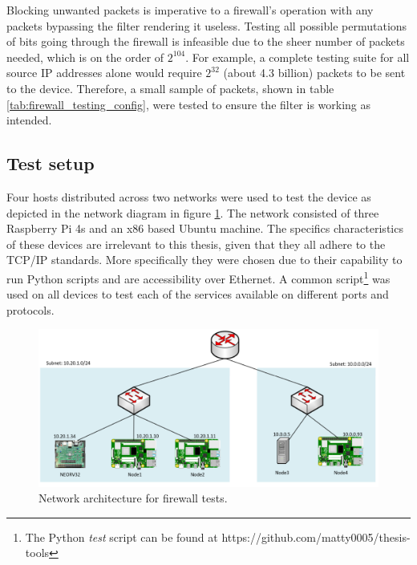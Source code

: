 Blocking unwanted packets is imperative to a firewall's operation with any packets bypassing the filter rendering it useless. Testing all possible permutations of bits going through the firewall is infeasible due to the sheer number of packets needed, which is on the order of $2^{104}$. For example, a complete testing suite for all source IP addresses alone would require $2^{32}$ (about 4.3 billion) packets to be sent to the device. Therefore, a small sample of packets, shown in table \ref{tab:firewall_testing_config}, were tested to ensure the filter is working as intended. 


\subsection{Test setup}

Four hosts distributed across two networks were used to test the device as depicted in the network diagram in figure \ref{fig:network_layout_test}. The network consisted of three Raspberry Pi 4s and an x86 based Ubuntu machine. The specifics characteristics of these devices are irrelevant to this thesis, given that they all adhere to the TCP/IP standards. More specifically they were chosen due to their capability to run Python scripts and are accessibility over Ethernet. A common script\footnote[1]{The Python \textit{test} script can be found at https://github.com/matty0005/thesis-tools} was used on all devices to test each of the services available on different ports and protocols. 



\begin{figure}[h]
    \centering
    \includegraphics[width=1\textwidth]{Images/NetworkArchitecture.png}
    \caption[Network architecture for firewall tests]{Network architecture for firewall tests.}
    \label{fig:network_layout_test}
\end{figure}

